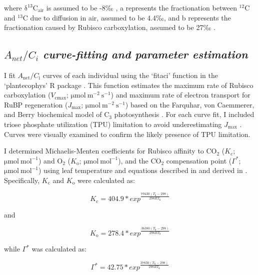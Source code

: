 \noindent where $\mathrm{\delta^{13}C_{air}}$ is assumed to be -8‰ , a represents the fractionation between $^{12}$C and $^{13}$C due to diffusion in air, assumed to be 4.4‰, and b represents the fractionation caused by Rubisco carboxylation, assumed to be 27‰ .
    
\subsection{$A_{net}/C_i$ \textit{curve-fitting and parameter estimation}}
\noindent I fit $A_\mathrm{net}/C_\mathrm{i}$ curves of each individual using the ‘fitaci’ function in the ‘plantecophys’ R package . This function estimates the maximum rate of Rubisco carboxylation ($V_\mathrm{cmax}$; $\mathrm{\mu mol\ m^{-2}\ s^{-1}}$) and maximum rate of electron transport for RuBP regeneration ($J_\mathrm{max}$; $\mathrm{\mu mol\ m^{-2}\ s^{-1}}$) based on the Farquhar, von Caemmerer, and Berry biochemical model of C$_{3}$ photosynthesis . For each curve fit, I included triose phosphate utilization (TPU) limitation to avoid underestimating $J_{\mathrm{max}}$ . Curves were visually examined to confirm the likely presence of TPU limitation. 
    
I determined Michaelis-Menten coefficients for Rubisco affinity to CO$_2$ ($K_\mathrm{c}$; $\mathrm{\mu mol\ mol^{-1}}$) and $\mathrm{O_2}$ ($K_\mathrm{o}$; $\mathrm{\mu mol\ mol^{-1}}$), and the CO$_2$ compensation point ($\Gamma^*$; $\mathrm{\mu mol\ mol^{-1}}$) using leaf temperature and equations described in  and derived in . Specifically, $K_\mathrm{c}$ and $K_\mathrm{o}$ were calculated as:

\begin{equation} \label{eq_2.3}
    K_\mathrm{c}=404.9*exp^{\frac{79430(T_\mathrm{k}-298)}{298RT_\mathrm{k}}}
\end{equation}
    
\noindent and
    
\begin{equation} \label{eq_2.4}
    K_\mathrm{o}=278.4*exp^{\frac{36380(T_\mathrm{k}-298)}{298RT_\mathrm{k}}}
\end{equation}
    
\noindent while $\Gamma^*$ was calculated as:
    
\begin{equation} \label{eq_2.5}
    \Gamma^\mathrm{*}=42.75*exp^{\frac{37830(T_\mathrm{k}-298)}{298RT_\mathrm{k}}}
\end{equation}

